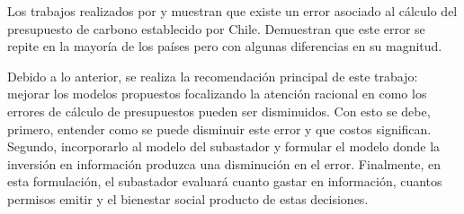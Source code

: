Los trabajos realizados por  y  muestran que existe un error asociado al cálculo del presupuesto de carbono establecido por Chile. Demuestran que este error se repite en la mayoría de los países pero con algunas diferencias en su magnitud.
\vspace{2.5mm}

Debido a lo anterior, se realiza la recomendación principal de este trabajo: mejorar los modelos propuestos focalizando la atención racional en como los errores de cálculo de presupuestos pueden ser disminuidos. Con esto se debe, primero, entender como se puede disminuir este error y que costos significan. Segundo, incorporarlo al modelo del subastador y formular el modelo donde la inversión en información produzca una disminución en el error. Finalmente, en esta formulación,  el subastador evaluará cuanto gastar en información, cuantos permisos emitir y el bienestar social producto de estas decisiones.




